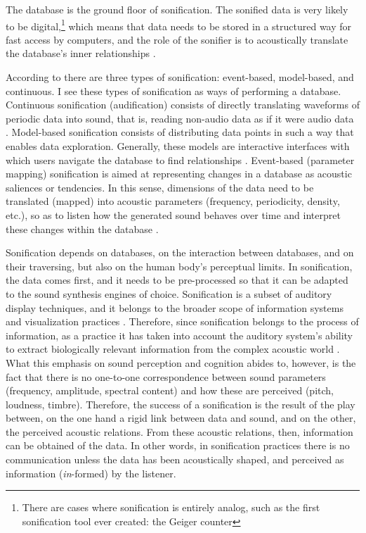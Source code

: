 
The database is the ground floor of sonification. The sonified data is very likely to be digital,\footnote{There are cases where sonification is entirely analog, such as the first sonification tool ever created: the Geiger counter} which means that data needs to be stored in a structured way for fast access by computers, and the role of the sonifier is to acoustically translate the database's inner relationships \parencite[9]{WalkerNees2011-TOS}.

According to \citeauthor{WalkerNees2011-TOS} there are three types of sonification: event-based, model-based, and continuous. I see these types of sonification as ways of performing a database. Continuous sonification (audification) consists of directly translating waveforms of periodic data into sound, that is, reading non-audio data as if it were audio data \parencite[17]{WalkerNees2011-TOS}. Model-based sonification consists of distributing data points in such a way that enables data exploration. Generally, these models are interactive interfaces with which users navigate the database to find relationships \parencite[17]{WalkerNees2011-TOS}. Event-based (parameter mapping) sonification is aimed at representing changes in a database as acoustic saliences or tendencies. In this sense, dimensions of the data need to be translated (mapped) into acoustic parameters (frequency, periodicity, density, etc.), so as to listen how the generated sound behaves over time and interpret these changes within the database \parencite[16]{WalkerNees2011-TOS}.

Sonification depends on databases, on the interaction between databases, and on their traversing, but also on the human body's perceptual limits. In sonification, the data comes first, and it needs to be pre-processed so that it can be adapted to the sound synthesis engines of choice. Sonification is a subset of auditory display techniques, and it belongs to the broader scope of information systems and visualization practices \parencite[10]{WalkerNees2011-TOS}. Therefore, since sonification belongs to the process of information, as a practice it has taken into account the auditory system's ability to extract biologically relevant information from the complex acoustic world \parencite{Carlile2011-P}. What this emphasis on sound perception and cognition abides to, however, is the fact that there is no one-to-one correspondence between sound parameters (frequency, amplitude, spectral content) and how these are perceived (pitch, loudness, timbre). Therefore, the success of a sonification is the result of the play between, on the one hand a rigid link between data and sound, and on the other, the perceived acoustic relations. From these acoustic relations, then, information can be obtained of the data. In other words, in sonification practices there is no communication unless the data has been acoustically shaped, and perceived as information (\textit{in}-formed) by the listener. 

